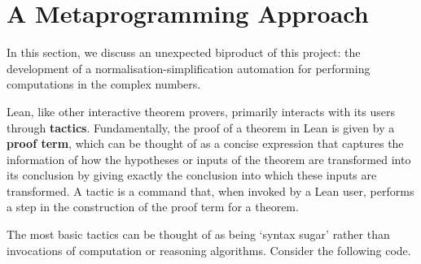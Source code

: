\section{A Metaprogramming Approach}
\label{Ch5:Sec:Meta}

In this section, we discuss an unexpected biproduct of this project: the development of a normalisation-simplification automation for performing computations in the complex numbers.

Lean, like other interactive theorem provers, primarily interacts with its users through \textbf{tactics}. Fundamentally, the proof of a theorem in Lean is given by a \textbf{proof term}, which can be thought of as a concise expression that captures the information of how the hypotheses or inputs of the theorem are transformed into its conclusion by giving exactly the conclusion into which these inputs are transformed. A tactic is a command that, when invoked by a Lean user, performs a step in the construction of the proof term for a theorem.

The most basic tactics can be thought of as being `syntax sugar' rather than invocations of computation or reasoning algorithms. Consider the following code.

